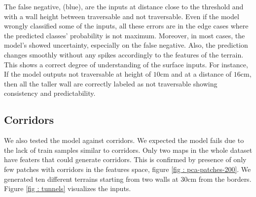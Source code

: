 The false negative, (blue), are the inputs at distance close to the threshold and with a wall height between traversable and not traversable. Even if the model wrongly classified some of the inputs, all these errors are in the edge cases where the predicted classes' probability is not maximum. Moreover, in most cases, the model's showed uncertainty, especially on the false negative. Also, the prediction changes smoothly without any spikes accordingly to the features of the terrain. This shows a correct degree of understanding of the surface inputs. For instance, If the model outputs not traversable at height of $10$cm and at a distance of $16$cm, then all the taller wall are correctly labeled as not traversable showing consistency and predictability. 
\subsection{Corridors}
We also tested the model against corridors. We expected the model fails due to the lack of train samples similar to corridors. Only two maps in the whole dataset have featers that could generate corridors. This is confirmed by presence of only few patches with corridors in the features space, figure \ref{fig : pca-patches-200}. We generated ten different terrains starting from two walls at $30$cm from the borders. Figure \ref{fig : tunnels}  visualizes the inputs.
